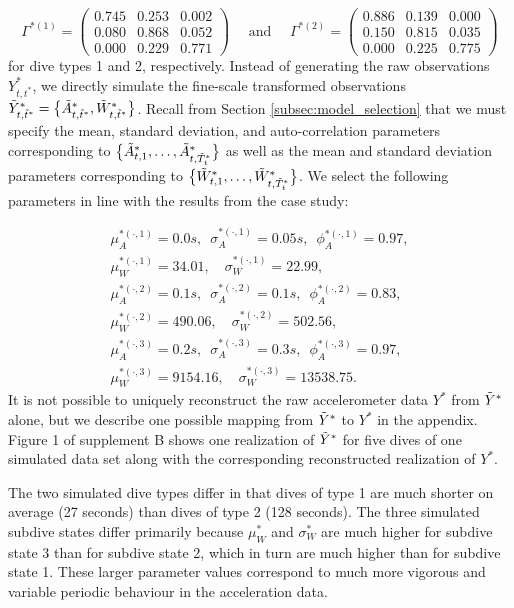 \[\Gamma^{*(1)} = \begin{pmatrix} 0.745 & 0.253 & 0.002 \\ 0.080 & 0.868 & 0.052 \\ 0.000 & 0.229 & 0.771 \end{pmatrix} \quad \text{ and } \quad \Gamma^{*(2)} = \begin{pmatrix} 0.886 & 0.139 & 0.000 \\ 0.150 & 0.815 & 0.035 \\ 0.000 & 0.225 & 0.775 \end{pmatrix}\]
%
for dive types 1 and 2, respectively.
Instead of generating the raw observations $Y^*_{t,t^*}$, we directly simulate the fine-scale transformed observations $\tilde{Y}^*_{t,\tilde t^*} = \big\{\tilde{A}^*_{t,\tilde t^*}, \tilde{W}^*_{t,\tilde t^*}\big\}$. Recall from Section \ref{subsec:model_selection} that we must specify the mean, standard deviation, and auto-correlation parameters corresponding to $\big\{\tilde{A}^*_{t,1},\ldots,\tilde{A}^*_{t,\tilde T_t^*}\big\}$ as well as the mean and standard deviation parameters corresponding to $\big\{\tilde{W}^*_{t,1},\ldots,\tilde{W}^*_{t,\tilde T_t^*}\big\}$. We select the following parameters in line with the results from the case study:

\begin{gather*}
    \mu_A^{*(\cdot,1)} = 0.0 s, \enspace \sigma_A^{*(\cdot,1)} = 0.05s, \enspace \phi_A^{*(\cdot,1)} = 0.97, \\
    \mu_W^{*(\cdot,1)} = 34.01, \quad \sigma_W^{*(\cdot,1)} = 22.99, \\
    \mu_A^{*(\cdot,2)} = 0.1 s, \enspace \sigma_A^{*(\cdot,2)} = 0.1s, \enspace \phi_A^{*(\cdot,2)} = 0.83, \\
    \mu_W^{*(\cdot,2)} = 490.06, \quad \sigma_W^{*(\cdot,2)} = 502.56, \\
    \mu_A^{*(\cdot,3)} = 0.2 s, \enspace \sigma_A^{*(\cdot,3)} = 0.3 s, \enspace \phi_A^{*(\cdot,3)} = 0.97, \\
    \mu_W^{*(\cdot,3)} = 9154.16, \quad \sigma_W^{*(\cdot,3)} = 13538.75.
\end{gather*}
%
It is not possible to uniquely reconstruct the raw accelerometer data $Y^*$ from $\tilde{Y}^*$ alone, but we describe one possible mapping from $\tilde{Y}^*$ to $Y^*$ in the appendix. Figure 1 of supplement B shows one realization of $\tilde{Y}^*$ for five dives of one simulated data set along with the corresponding reconstructed realization of $Y^*$. 

The two simulated dive types differ in that dives of type 1 are much shorter on average (27 seconds) than dives of type 2 (128 seconds). The three simulated subdive states differ primarily because $\mu_W^*$ and $\sigma_W^*$ are much higher for subdive state 3 than for subdive state 2, which in turn are much higher than for subdive state 1. These larger parameter values correspond to much more vigorous and variable periodic behaviour in the acceleration data. 

